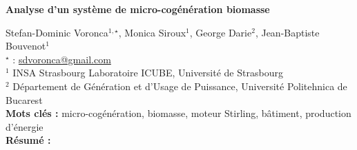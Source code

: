 


    \newpage

\BgThispage

%
\begin{flushleft}
\addtocounter{section}{1}
{\Large \textbf{Analyse d'un système de micro-cogénération biomasse}}\label{ref:80}
\end{flushleft}
%
Stefan-Dominic Voronca$^{1,\star}$, Monica Siroux$^{1}$, George Darie$^{2}$, Jean-Baptiste Bouvenot$^{1}$\\[2mm]
$^{\star}$ \Letter : \url{sdvoronca@gmail.com}\\[2mm]
{\footnotesize $^{1}$ INSA Strasbourg Laboratoire ICUBE, Université de Strasbourg}\\
{\footnotesize $^{2}$ Département de Génération et d'Usage de Puissance, Université Politehnica de Bucarest}\\
[4mm]
%
\noindent \textbf{Mots clés : } micro-cogénération, biomasse, moteur Stirling, bâtiment, production d'énergie\\[4mm]
%
\noindent \textbf{Résumé : } 

